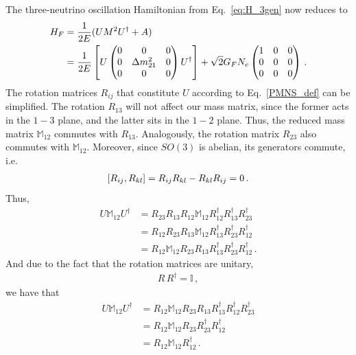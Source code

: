 The three-neutrino oscillation Hamiltonian from Eq.~\eqref{eq:H_3gen}
now reduces to 
\begin{align}
    H_F &= \frac{1}{2E}(U M^2 U^\dagger + A) \nonumber \\
        &= \frac{1}{2E}\left[U \begin{pmatrix}
            0 & 0 & 0 \\
            0 & \dm_{21} & 0 \\
            0 & 0 & 0
        \end{pmatrix} U^\dagger\right] + \sqrt{2}G_F N_e \begin{pmatrix}
            1 & 0 & 0 \\
            0 & 0 & 0 \\
            0 & 0 & 0
        \end{pmatrix}\,. 
\end{align}
The rotation matrices $R_{ij}$ that constitute $U$ according to Eq.~\eqref{PMNS_def} can be simplified. The rotation $R_{13}$ will not affect our mass matrix, since the former acts in the $1-3$ plane, and the latter sits in the $1-2$ plane. Thus, the reduced mass matrix $\mathbb{M}_{12}$ commutes with $R_{13}$. Analogously, the  rotation matrix $R_{23}$ also commutes with $\mathbb{M}_{12}$.
Moreover, since $SO(3)$ is abelian, its generators commute, i.e.
\begin{align}
    \commutator{R_{ij}}{R_{kl}} = R_{ij}R_{kl} - R_{kl}R_{ij} = 0\,.
\end{align}
Thus,
\begin{align}
    U \mathbb{M}_{12} U^\dagger &=
    R_{23}R_{13}R_{12} \mathbb{M}_{12}  R_{12}^\dagger R_{13}^\dagger  R_{23}^\dagger \nonumber \\
    &= R_{12}R_{23}R_{13} \mathbb{M}_{12}  R_{13}^\dagger R_{23}^\dagger R_{12}^\dagger   \nonumber \\
    &= R_{12}\mathbb{M}_{12} R_{23} R_{13}   R_{13}^\dagger R_{23}^\dagger R_{12}^\dagger  \,.
\end{align}
And due to the fact that the rotation matrices are unitary,
\begin{align}
    R\,R^\dagger = \mathbb{I}\,,
\end{align}
we have that 
\begin{align}
    U \mathbb{M}_{12} U^\dagger &= R_{12}\mathbb{M}_{12}R_{23} R_{13}   R_{13}^\dagger R_{12}^\dagger  R_{23}^\dagger \nonumber \\
    &= R_{12}\mathbb{M}_{12}R_{23} R_{23}^\dagger  R_{12}^\dagger \nonumber \\
    &= R_{12}\mathbb{M}_{12}  R_{12}^\dagger\,.
\end{align}
